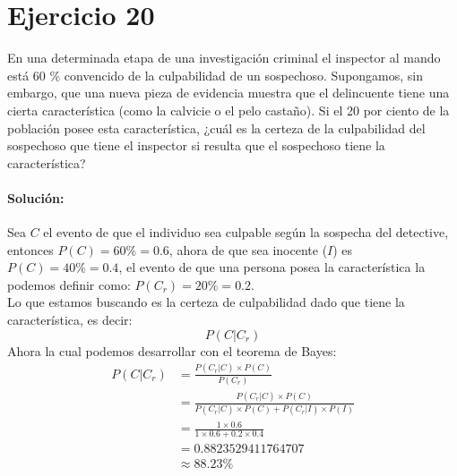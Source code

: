 \documentclass[12pt]{article}
\begin{document}
\section{Ejercicio 20}
 En una determinada etapa de una investigación criminal el inspector al mando está 60 \%
convencido de la culpabilidad de un sospechoso. Supongamos, sin embargo, que una nueva
pieza de evidencia muestra que el delincuente tiene una cierta característica (como la calvicie
o el pelo castaño). Si el 20 por ciento de la población posee esta característica, ¿cuál es la
certeza de la culpabilidad del sospechoso que tiene el inspector si resulta que el sospechoso
tiene la característica?\\
\paragraph{Solución:} Sea $C$ el evento de que el individuo sea culpable según la sospecha del detective, entonces $P(C) = 60\% = 0.6$, ahora de que sea inocente ($I$) es $P(C) = 40\% = 0.4$, el evento de que una persona posea la característica la podemos definir como:
$P(C_r) = 20\% = 0.2$.\\
Lo que estamos buscando es la certeza de culpabilidad dado que tiene la característica, es decir:
\begin{equation}
	P(C|C_r)
\end{equation}
Ahora la cual podemos desarrollar con el teorema de Bayes:
\begin{equation}
\begin{split}
P(C|C_r)&=\frac{P(C_r|C)\times P(C)}{P(C_r)}\\
&=\frac{P(C_r|C)\times P(C)}{P(C_r|C)\times P(C) + P(C_r|I)\times P(I)}\\
&=\frac{1\times 0.6}{1\times 0.6 +  0.2 \times 0.4}\\
&= 0.8823529411764707\\
&\approx 88.23\%\\
\end{split}
\end{equation}
\end{document}
